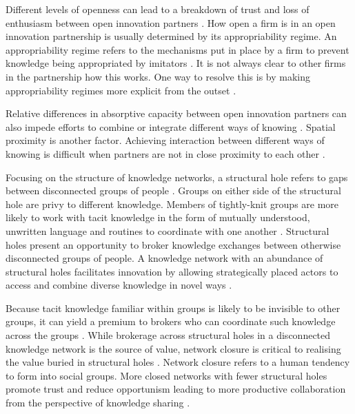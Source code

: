 Different levels of openness can lead to a breakdown of trust and loss of enthusiasm between open innovation partners \citep{laursen2014paradox,dragsdahl2019perspective}. How open a firm is in an open innovation partnership is usually determined by its appropriability regime. An appropriability regime refers to the mechanisms put in place by a firm to prevent knowledge being appropriated by imitators \citep{teece1998capturing,hurmelinna2008appropriability}. It is not always clear to other firms in the partnership how this works. One way to resolve this is by making appropriability regimes more explicit from the outset \citep{gama2019managing}. \medskip

Relative differences in absorptive capacity between open innovation partners can also impede efforts to combine or integrate different ways of knowing \citep{vanhaverbeke2007connecting,lichtenthaler2016absorptive}. Spatial proximity is another factor. Achieving interaction between different ways of knowing is difficult when partners are not in close proximity to each other \citep{wineman2009spatial,roper2018knowledge}. \medskip

Focusing on the structure of knowledge networks, a structural hole refers to gaps between disconnected groups of people \citep{burt2000network}. Groups on either side of the structural hole are privy to different knowledge. Members of tightly-knit groups are more likely to work with tacit knowledge in the form of mutually understood, unwritten language and routines to coordinate with one another \citep{burt2007secondhand}. Structural holes present an opportunity to broker knowledge exchanges between otherwise disconnected groups of people. A knowledge network with an abundance of structural holes facilitates innovation by allowing strategically placed actors to access and combine diverse knowledge in novel ways \citep{burt2004structural,sparrowe2011publishing}. \medskip

Because tacit knowledge familiar within groups is likely to be invisible to other groups, it can yield a premium to brokers who can coordinate such knowledge across the groups \citep{burt2007secondhand}. While brokerage across structural holes in a disconnected knowledge network is the source of value, network closure is critical to realising the value buried in structural holes \citep{burt2004structural,rost2011strength}. Network closure refers to a human tendency to form into social groups. More closed networks with fewer structural holes promote trust and reduce opportunism leading to more productive collaboration from the perspective of knowledge sharing \citep{ahuja2000collaboration}. \medskip

